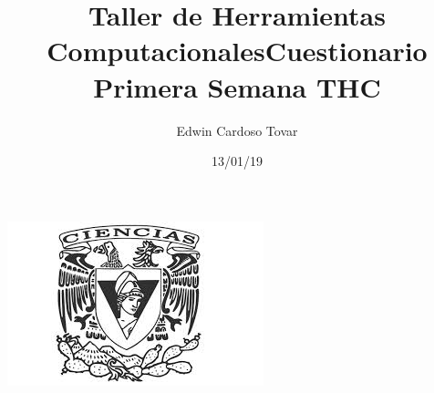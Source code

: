 \documentclass[letterpaper, 12pt, oneside]{article}%
\title{\Huge Taller de Herramientas Computacionales}
\author{Edwin Cardoso Tovar}%
\date{13/01/19}%
\begin{document}
\maketitle
\begin{center}%
\includegraphics[scale=0.70]{1.jpg}%
\end{center}%
\newpage%

\title{\Huge Cuestionario Primera Semana THC\\}%
\end{document}
